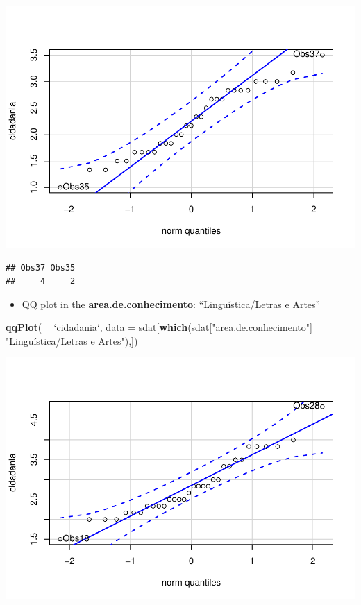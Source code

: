 \documentclass[]{article}
\newenvironment{Shaded}{\begin{snugshade}}{\end{snugshade}}
\newcommand{\DataTypeTok}[1]{\textcolor[rgb]{0.13,0.29,0.53}{#1}}
\newcommand{\KeywordTok}[1]{\textcolor[rgb]{0.13,0.29,0.53}{\textbf{#1}}}
\newcommand{\NormalTok}[1]{#1}
\newcommand{\OperatorTok}[1]{\textcolor[rgb]{0.81,0.36,0.00}{\textbf{#1}}}
\newcommand{\StringTok}[1]{\textcolor[rgb]{0.31,0.60,0.02}{#1}}
\providecommand{\tightlist}{%
  \setlength{\itemsep}{0pt}\setlength{\parskip}{0pt}}
\begin{document}
\includegraphics{factorialAnova_files/figure-latex/unnamed-chunk-28-1.pdf}

\begin{verbatim}
## Obs37 Obs35 
##     4     2
\end{verbatim}

\begin{itemize}
\tightlist
\item
  QQ plot in the \textbf{area.de.conhecimento}: ``Linguística/Letras e
  Artes''
\end{itemize}

\begin{Shaded}
\begin{Highlighting}[]
\KeywordTok{qqPlot}\NormalTok{( }\OperatorTok{~}\StringTok{ `}\DataTypeTok{cidadania}\StringTok{`}\NormalTok{, }\DataTypeTok{data =}\NormalTok{ sdat[}\KeywordTok{which}\NormalTok{(sdat[}\StringTok{"area.de.conhecimento"}\NormalTok{] }\OperatorTok{==}\StringTok{ "Linguística/Letras e Artes"}\NormalTok{),])}
\end{Highlighting}
\end{Shaded}

\includegraphics{factorialAnova_files/figure-latex/unnamed-chunk-29-1.pdf}
\end{document}
